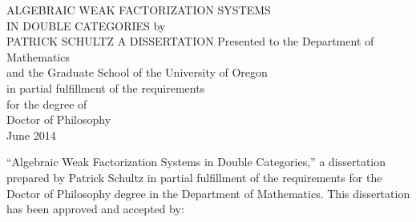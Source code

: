 \documentclass[11pt]{UOthesis}
\begin{document}

	\setlength{\parindent}{0in} 	



	
	\thispagestyle{empty}	%
	\vspace*{50pt}
	\begin{center} %
		ALGEBRAIC WEAK FACTORIZATION SYSTEMS\\
		IN DOUBLE CATEGORIES
	\vfill
		by	\\ %
		PATRICK SCHULTZ
	\vfill
		A DISSERTATION
	{\singlespace
		Presented to the Department of Mathematics\\
		and the Graduate School of the University of Oregon\\
		in partial fulfillment of the requirements\\
		for the degree of\\
		Doctor of Philosophy \\
		
		June 2014
		}%
	\end{center}



	\newpage
	\TOP

	``Algebraic Weak Factorization Systems in Double Categories,''
		a dissertation prepared by 
		Patrick Schultz %
	 	in partial fulfillment of the requirements for the
	 	Doctor of Philosophy 
	 	degree in the 
	 Department of Mathematics. 
		This dissertation has been approved and accepted by: \\[60pt]
\end{document}
